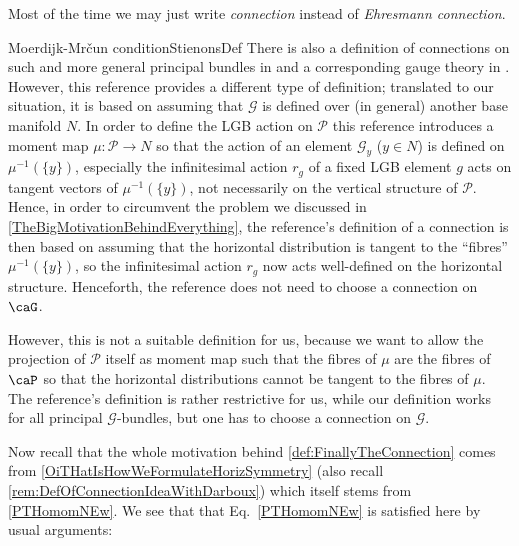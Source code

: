 \documentclass[reqno,a4paper,oneside]{amsart}
\theoremstyle{plain}
\theoremstyle{remark}
\theoremstyle{definition}
\begin{document}
Most of the time we may just write \textit{connection} instead of \textit{Ehresmann connection}.

\begin{remarks}{Moerdijk-Mrčun condition}{StienonsDef}
There is also a definition of connections on such and more general principal bundles in \cite[\S 5.7, paragraph before Prop.\ 5.38, page 148]{GroupoidBasedPrincipalBundles} and a corresponding gauge theory in \cite{Signori:2008jd}. However, this reference provides a different type of definition; translated to our situation, it is based on assuming that $\mathcal{G}$ is defined over (in general) another base manifold $N$. In order to define the LGB action on $\mathcal{P}$ this reference introduces a moment map $\mu\colon \mathcal{P} \to N$ so that the action of an element $\mathcal{G}_y$ ($y \in N$) is defined on $\mu^{-1}(\{y\})$, especially the infinitesimal action $r_g$ of a fixed LGB element $g$ acts on tangent vectors of $\mu^{-1}(\{y\})$, not necessarily on the vertical structure of $\mathcal{P}$. Hence, in order to circumvent the problem we discussed in \ref{TheBigMotivationBehindEverything}, the reference's definition of a connection is then based on assuming that the horizontal distribution is tangent to the ``fibres'' $\mu^{-1}(\{y\})$, so the infinitesimal action $r_g$ now acts well-defined on the horizontal structure. Henceforth, the reference does not need to choose a connection on $\caG$.

However, this is not a suitable definition for us, because we want to allow the projection of $\mathcal{P}$ itself as moment map such that the fibres of $\mu$ are the fibres of $\caP$ so that the horizontal distributions cannot be tangent to the fibres of $\mu$. The reference's definition is rather restrictive for us, while our definition works for all principal $\mathcal{G}$-bundles, but one has to choose a connection on $\mathcal{G}$.
\end{remarks}

Now recall that the whole motivation behind \ref{def:FinallyTheConnection} comes from \eqref{OiTHatIsHowWeFormulateHorizSymmetry} (also recall \ref{rem:DefOfConnectionIdeaWithDarboux}) which itself stems from \eqref{PTHomomNEw}. We see that that Eq.\ \eqref{PTHomomNEw} is satisfied here by usual arguments:
\end{document}
